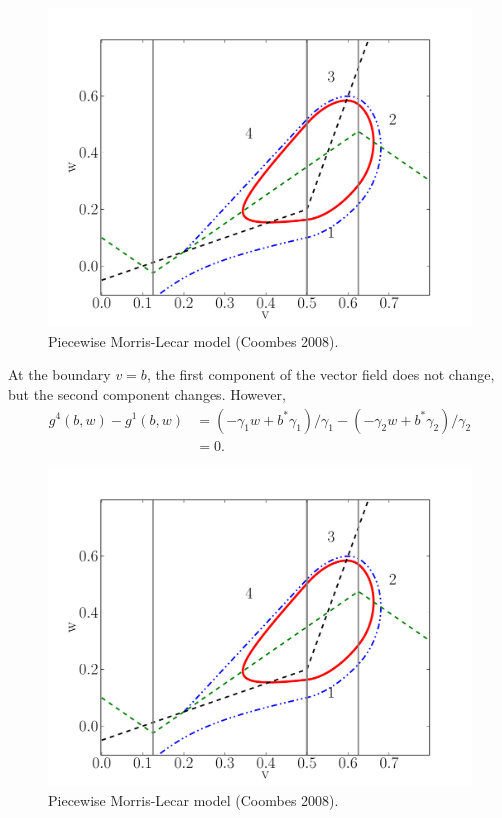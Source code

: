 \documentclass{beamer}
\begin{document}
\begin{frame}
\begin{figure}
\frametitle{\insertsection}
  \framesubtitle{\insertsubsection}
 \includegraphics[width=.8\textwidth]{pml_fig.pdf}
 \caption{Piecewise Morris-Lecar model (Coombes 2008).}
\end{figure}
\end{frame}

\begin{frame}
At the boundary $v=b$, the first component of the vector field does not change, but the second component changes.  However,
 \begin{equation}
\begin{split}
g^4(b,w) - g^1(b,w) &= (-\gamma_1w+b^*\gamma_1)/\gamma_1- (-\gamma_2w+b^* \gamma_2)/\gamma_2 \\
&= 0.
\end{split}
\end{equation}

\begin{figure}
 \includegraphics[width=.6\textwidth]{pml_fig.pdf}
 \caption{Piecewise Morris-Lecar model (Coombes 2008).}
\end{figure}
\end{frame}
\end{document}
